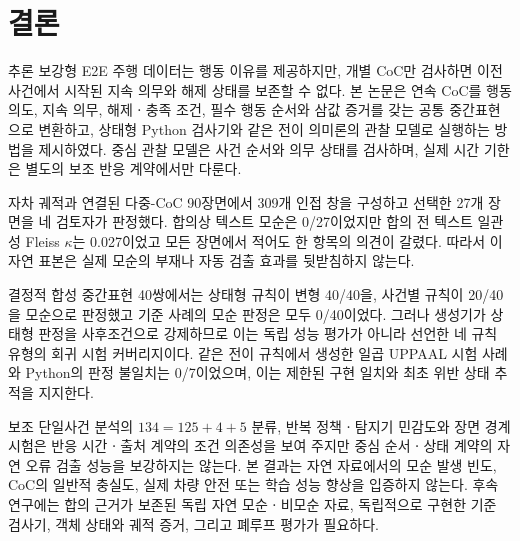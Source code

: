 \section{결론}
\label{sec:conclusion}

추론 보강형 E2E 주행 데이터는 행동 이유를 제공하지만, 개별 CoC만 검사하면 이전 사건에서 시작된 지속 의무와 해제 상태를 보존할 수 없다. 본 논문은 연속 CoC를 행동 의도, 지속 의무, 해제ㆍ충족 조건, 필수 행동 순서와 삼값 증거를 갖는 공통 중간표현으로 변환하고, 상태형 Python 검사기와 같은 전이 의미론의 \uppaal 관찰 모델로 실행하는 방법을 제시하였다. 중심 관찰 모델은 사건 순서와 의무 상태를 검사하며, 실제 시간 기한은 별도의 보조 반응 계약에서만 다룬다.

자차 궤적과 연결된 다중-CoC 90장면에서 309개 인접 창을 구성하고 선택한 27개 장면을 네 검토자가 판정했다. 합의상 텍스트 모순은 0/27이었지만 합의 전 텍스트 일관성 Fleiss $\kappa$는 0.027이었고 모든 장면에서 적어도 한 항목의 의견이 갈렸다. 따라서 이 자연 표본은 실제 모순의 부재나 자동 검출 효과를 뒷받침하지 않는다.

결정적 합성 중간표현 40쌍에서는 상태형 규칙이 변형 40/40을, 사건별 규칙이 20/40을 모순으로 판정했고 기준 사례의 모순 판정은 모두 0/40이었다. 그러나 생성기가 상태형 판정을 사후조건으로 강제하므로 이는 독립 성능 평가가 아니라 선언한 네 규칙 유형의 회귀 시험 커버리지이다. 같은 전이 규칙에서 생성한 일곱 UPPAAL 시험 사례와 Python의 판정 불일치는 0/7이었으며, 이는 제한된 구현 일치와 최초 위반 상태 추적을 지지한다.

보조 단일사건 분석의 $134=125+4+5$ 분류, 반복 정책ㆍ탐지기 민감도와 장면 경계 시험은 반응 시간ㆍ출처 계약의 조건 의존성을 보여 주지만 중심 순서ㆍ상태 계약의 자연 오류 검출 성능을 보강하지는 않는다. 본 결과는 자연 자료에서의 모순 발생 빈도, CoC의 일반적 충실도, 실제 차량 안전 또는 학습 성능 향상을 입증하지 않는다. 후속 연구에는 합의 근거가 보존된 독립 자연 모순ㆍ비모순 자료, 독립적으로 구현한 기준 검사기, 객체 상태와 궤적 증거, 그리고 폐루프 평가가 필요하다.
